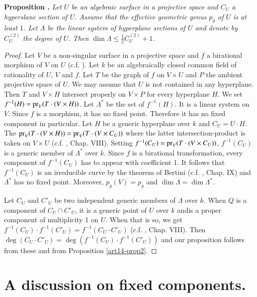 \medskip
\noindent
{\bf Proposition .\label{art14-prop3}}
{\em Let $U$ be an algebraic surface in a projective space and $C_{U}$ a hyperslane section of $U$. Assume that the effective geometric genus $p_{g}$ of $U$ is at least $1$. Let $\Lambda$ be the linear system of hyperplane sections of $U$ and denote by $C^{(2)}_{U}$ the degree of $U$. Then $\dim \Lambda \leq \frac{1}{2}C^{(2)}_{U}+1$.}

\begin{proof}
Let $V$ be a non-singular surface in a projective space and $f$ a birational morphism of $V$ on $U$ (c.f. \cite{art14-key34}). Let $k$ be an algebraically closed common field of rationality of $U$, $V$ and $f$. Let $T$ be the graph of $f$ on $V\times U$ and $P$ the ambient projective space of $U$. We may assume that $U$ is not contained in any hyperplane. Then $T$ and $V\times H$ intersect properly on $V\times P$ for every hyperplane $H$. We set $f^{-1}(H)=\operatorname{\mathrm{pr}}_{V}(T\cdot (V\times H))$. Let $\Lambda^{*}$ be the set of $f^{-1}(H)$. It is a linear system on $V$. Since $f$ is a morphism, it has no fixed point. Therefore it has no fixed component in particular. Let $H$ be a generic hyperplane over $k$ and $C_{U}=U\cdot H$. The $\operatorname{\mathrm{pr}}_{V}(T\cdot (V\times H))=\operatorname{\mathrm{pr}}_{V}(T\cdot (V\times C_{U}))$ where the latter intersection-product is taken on $V\times U$ (c.f. \cite{art14-key25}, Chap. VIII). Setting $f^{-1}(C_{U})=\operatorname{\mathrm{pr}}_{V}(T\cdot (V\times C_{U}))$, $f^{-1}(C_{U})$ is a generic member of $\Lambda^{*}$ over $k$. Since $f$ is a birational transformation, every component of $f^{-1}(C_{U})$ has to appear with coefficient 1. It follows that $f^{-1}(C_{U})$ is an irreducible curve by the theorem of Bertini (c.f. \cite{art14-key25}, Chap. IX) and $\Lambda^{*}$ has no fixed point. Moreover, $p_{g}(V)=p_{g}$ and $\dim \Lambda = \dim \Lambda^{*}$.

Let $C_{U}$ and $C'_{U}$ be two independent generic members of $\Lambda$ over $k$. When $Q$ is a component of $C_{U}\cap C'_{U}$, it is a generic point of $U$ over $k$ and\pageoriginale is a proper component of multiplicity 1 on $U$. When that is so, we get $f^{-1}(C_{U})\cdot f^{-1}(C'_{U})=f^{-1}(C_{U}\cdot C'_{U})$ (c.f. \cite{art14-key25}, Chap. VIII). Then $\deg (C_{U}\cdot C'_{U})=\deg (f^{-1}(C_{U})\cdot f^{-1}(C'_{U}))$ and our proposition follows from these and from Proposition \ref{art14-prop2}.
\end{proof}

\section{A discussion on fixed components.}\label{art14-sec3}

